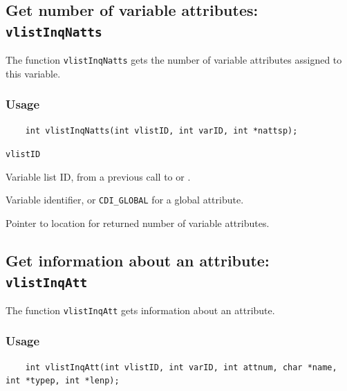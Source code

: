 

\subsection{Get number of variable attributes: {\tt vlistInqNatts}}
\label{vlistInqNatts}

The function {\tt vlistInqNatts} gets the number of variable attributes assigned to this variable.

\subsubsection*{Usage}

\begin{verbatim}
    int vlistInqNatts(int vlistID, int varID, int *nattsp);
\end{verbatim}

\hspace*{4mm}\begin{minipage}[]{15cm}
\begin{deflist}{\tt vlistID\ }
\item[{\tt vlistID}]
Variable list ID, from a previous call to {} or {}.
\item[{\tt varID}]
Variable identifier, or {\tt CDI\_GLOBAL} for a global attribute.
\item[{\tt nattsp}]
Pointer to location for returned number of variable attributes.

\end{deflist}
\end{minipage}


\subsection{Get information about an attribute: {\tt vlistInqAtt}}
\label{vlistInqAtt}

The function {\tt vlistInqAtt} gets information about an attribute.

\subsubsection*{Usage}

\begin{verbatim}
    int vlistInqAtt(int vlistID, int varID, int attnum, char *name, int *typep, int *lenp);
\end{verbatim}

